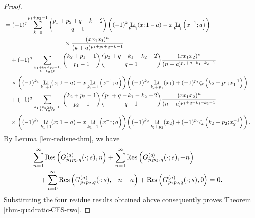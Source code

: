 \documentclass[11pt]{article}
\newcommand\Res{{\rm Res}}
\DeclareMathOperator{\Li}{Li}
\theoremstyle{plain}
\theoremstyle{definition}
\begin{document}
\begin{proof}
\begin{align*}
	&=(-1)^q\sum_{k=0}^{p_1+p_2-1}\binom{p_1+p_2+q-k-2}{q-1}\left((-1)^k\Li_{k+1}(x;1-a)-x \Li_{k+1}\Big(x^{-1};a\Big)\right)\\&\qquad\qquad\qquad\qquad\qquad\times \frac{(xx_1x_2)^n}{(n+a)^{p_1+p_2+q-k-1}}\\
	&\quad+(-1)^q \sum_{k_1+k_2\leq p_2-1,\atop k_1,k_2\geq 0} \binom{k_2+p_1-1}{p_1-1}\binom{p_2+q-k_1-k_2-2}{q-1}\frac{(xx_1x_2)^n}{(n+a)^{p_2+q-k_1-k_2-1}} \nonumber\\&\quad\times\left((-1)^{k_1}\Li_{k_1+1}(x;1-a)-x \Li_{k_1+1}\Big(x^{-1};a\Big)\right)\left((-1)^{k_2}\Li_{k_2+p_1}(x_1)+(-1)^{p_1}\zeta_n\Big(k_2+p_1;x_1^{-1}\Big)\right)\\
	&\quad+(-1)^q \sum_{k_1+k_2\leq p_1-1,\atop k_1,k_2\geq 0} \binom{k_2+p_2-1}{p_2-1}\binom{p_1+q-k_1-k_2-2}{q-1}\frac{(xx_1x_2)^n}{(n+a)^{p_1+q-k_1-k_2-1}} \nonumber\\&\quad\times\left((-1)^{k_1}\Li_{k_1+1}(x;1-a)-x \Li_{k_1+1}\Big(x^{-1};a\Big)\right)\left((-1)^{k_2}\Li_{k_2+p_2}(x_2)+(-1)^{p_2}\zeta_n\Big(k_2+p_2;x_2^{-1}\Big)\right).
\end{align*}
By Lemma \ref{lem-redisue-thm}, we have
\begin{align*}
	&\sum_{n=1}^\infty \Res\left(G^{(a)}_{p_1p_2,q}(\cdot;s),n\right)+\sum_{n=1}^\infty \Res\left(G^{(a)}_{p_1p_2,q}(\cdot;s),-n\right)\\&\quad+\sum_{n=0}^\infty\Res\left(G^{(a)}_{p_1p_2,q}(\cdot;s),-n-a\right)+\Res\left(G^{(a)}_{p_1p_2,q}(\cdot;s),0\right)=0.
\end{align*}
Substituting the four residue results obtained above consequently proves Theorem \ref{thm-quadratic-CES-two}.
\end{proof}
\end{document}
